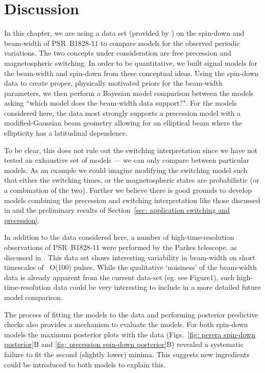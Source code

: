 \documentclass[../full_thesis/full_thesis.tex]{subfiles}
\begin{document}
\section{Discussion}
\label{sec: discussion}

In this chapter, we are using a data set (provided by \citet{Lyne2010}) on the
spin-down and beam-width of PSR~B1828-11 to compare models for the observed
periodic variations.  The two concepts under consideration are free precession
and magnetospheric switching.  In order to be quantitative, we built signal
models for the beam-width and spin-down from these conceptual ideas. Using the
spin-down data to create proper, physically motivated priors for the beam-width
parameters, we then perform a Bayesian model comparison between the models
asking ``which model does the beam-width data support?". For the models
considered here, the data most strongly supports a precession model with a
modified-Gaussian beam geometry allowing for an elliptical beam where the
ellipticity has a latitudinal dependence.

To be clear, this does not rule out the switching interpretation since we have
not tested an exhaustive set of models --- we can only compare between particular
models. As an example we could imagine modifying the switching model such that
either the switching times, or the magnetospheric states are probabilistic (or
a combination of the two).  Further we believe there is good grounds to develop
models combining the precession and switching interpretation like those
discussed in \citet{Jones2012} and the preliminary results of Section~\ref{sec:
application switching and precession}.

In addition to the data considered here, a number of
high-time-resolution observations of PSR~B1828-11 were performed
by the Parkes telescope, as discussed in \citet{Stairs2003}.
This data set shows interesting variability in beam-width on short
timescales of ~O(100) pulses. While the qualitative `noisiness' of the
beam-width data is already apparent from the current data-set (eg. see
Figure1), such high-time-resolution data could be very interesting to
include in a more detailed future model comparison.

The process of fitting the models to the data and performing posterior
predictive checks also provides a mechanism to evaluate the models. For both
spin-down models the maximum posterior plots with the data (Figs.~\ref{fig:
perera spin-down posterior}B and \ref{fig: precession spin-down posterior}B)
revealed a systematic failure to fit the second (slightly lower) minima. This
suggests new ingredients could be introduced to both models to explain this.
\end{document}

